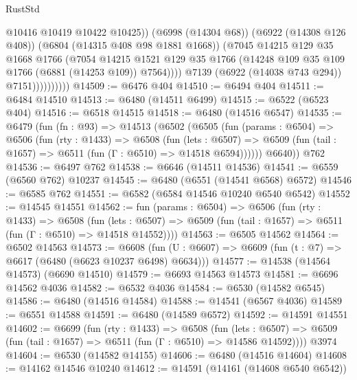 \begin{lexlean}{RustStd}
\begin{coremodule}
                              @10416
                              @10419
                              @10422
                              @10425))
                          (@6998 (@14304 @68))
                          (@6922 (@14308 @126 @408))
                          (@6804 (@14315 @408 @98 @1881 @1668))
                          (@7045
                            @14215
                            @129
                            @35
                            @1668
                            @1766
                            (@7054
                              @14215
                              @1521
                              @129
                              @35
                              @1766
                              (@14248 @109 @35 @109 @1766 (@6881 (@14253 @109)) @7564))))
                        @7139
                        (@6922 (@14038 @743 @294))
                        @7151))))))))))
@14509 := @6476 @404
@14510 := @6494 @404
@14511 := @6484 @14510
@14513 := @6480 (@14511 @6499)
@14515 := @6522 (@6523 @404)
@14516 := @6518 @14515
@14518 := @6480 (@14516 @6547)
@14535 := @6479
    (fun (fn : @93) =>
    @14513
      (@6502
        (@6505
          (fun (params : @6504) =>
          @6506
            (fun (rty : @1433) =>
            @6508
              (fun (lets : @6507) =>
              @6509 (fun (tail : @1657) => @6511 (fun (Γ : @6510) => @14518 @6594))))))
        @6640))
    @762
@14536 := @6497 @762
@14538 := @6646 (@14511 @14536)
@14541 := @6559 (@6560 @762) @10237
@14545 := @6480 (@6551 (@14541 @6568) @6572)
@14546 := @6585 @762
@14551 := @6582 (@6584 @14546 @10240 @6540 @6542)
@14552 := @14545 @14551
@14562 := fun (params : @6504) =>
  @6506
    (fun (rty : @1433) =>
    @6508
      (fun (lets : @6507) =>
      @6509 (fun (tail : @1657) => @6511 (fun (Γ : @6510) => @14518 @14552))))
@14563 := @6505 @14562
@14564 := @6502 @14563
@14573 := @6608
    (fun (U : @6607) => @6609 (fun (t : @7) => @6617 (@6480 (@6623 @10237 @6498) @6634)))
@14577 := @14538 (@14564 @14573) (@6690 @14510)
@14579 := @6693 @14563 @14573
@14581 := @6696 @14562 @4036
@14582 := @6532 @4036
@14584 := @6530 (@14582 @6545)
@14586 := @6480 (@14516 @14584)
@14588 := @14541 (@6567 @4036)
@14589 := @6551 @14588
@14591 := @6480 (@14589 @6572)
@14592 := @14591 @14551
@14602 := @6699
    (fun (rty : @1433) =>
    @6508
      (fun (lets : @6507) =>
      @6509 (fun (tail : @1657) => @6511 (fun (Γ : @6510) => @14586 @14592))))
    @3974
@14604 := @6530 (@14582 @14155)
@14606 := @6480 (@14516 @14604)
@14608 := @14162 @14546 @10240
@14612 := @14591 (@14161 (@14608 @6540 @6542))

\end{coremodule}
\end{lexlean}
